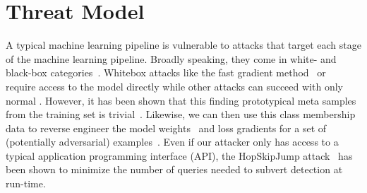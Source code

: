 \documentclass{article}
\begin{document}
\section{Threat Model}
\label{threat}
A typical machine learning pipeline is vulnerable to attacks that target each stage of the machine learning pipeline. Broadly speaking, they come in white- and black-box categories~\cite{meyers}. Whitebox attacks like the fast gradient method~\cite{fgm} or~\cite{deepfool} require access to the model directly while other attacks can succeed with only normal . However, it has been shown that this finding prototypical meta samples from the training set is trivial~\cite{chakraborty_adversarial_2018}. Likewise, we can then use this class membership data to reverse engineer the model weights~\cite{} and loss gradients for a set of (potentially adversarial) examples~\cite{}. Even if our attacker only has access to a typical application programming interface (API), the HopSkipJump attack~\cite{hopskipjump} has been shown to minimize the number of queries needed to subvert detection at run-time. 



\end{document}
